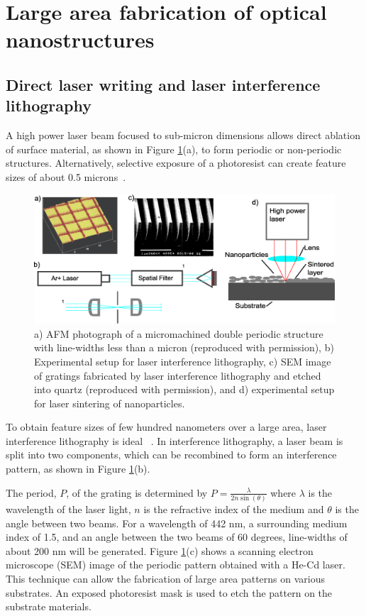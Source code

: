 \documentclass[10pt,letterpaper]{article}
\begin{document}
\section{Large area fabrication of optical nanostructures}
\subsection{Direct laser writing and laser interference lithography}
A high power laser beam focused to sub-micron dimensions allows direct 
ablation of surface material,  as shown in Figure \ref{gfig12_comb}(a), to form periodic or non-periodic structures.   Alternatively, selective exposure of a 
photoresist can create feature sizes of about 0.5 microns~\cite{g29}. 

\begin{figure}[ht]
	\includegraphics[width=\textwidth]{gfig12_comb}
	\caption{\label{gfig12_comb} a) AFM photograph of a micromachined double periodic structure with line-widths less than a micron \cite{g29} (reproduced with permission), b) Experimental setup for laser interference lithography, c) SEM image of gratings fabricated by laser interference lithography and etched into quartz \cite{g30} (reproduced with permission), and d) experimental setup for laser sintering of nanoparticles.} %
\end{figure}

To obtain feature sizes of few hundred nanometers over a large area, laser interference lithography is ideal ~\cite{g30}. In interference lithography, a laser beam is split into two components, which can be recombined to form an interference pattern,  as shown in Figure \ref{gfig12_comb}(b). 

The period, $P$,  of the grating is determined by $P =\frac{\lambda}{2n\sin(\theta)}$ where  $\lambda$ is the wavelength of the laser light, $n$ is the refractive index of the medium and $\theta$ is the angle between two beams. For a wavelength of 442 nm, a surrounding medium index of 1.5, and an angle between the two beams of 60 degrees, line-widths of about 200 nm will be generated.  
Figure \ref{gfig12_comb}(c) shows a scanning electron microscope (SEM) image of the periodic pattern obtained with a He-Cd laser. This technique can allow the fabrication of large area patterns on various substrates. An exposed photoresist mask is used to etch the pattern on the substrate materials. 
\end{document}
